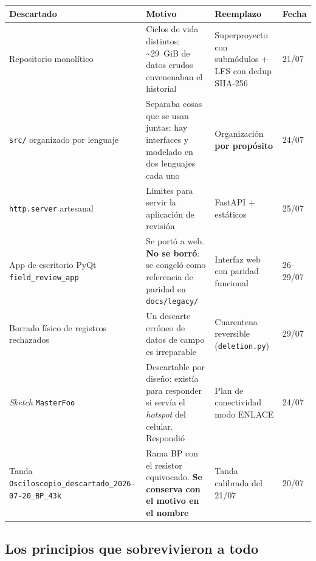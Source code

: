 \begin{center}\footnotesize
\begin{tabularx}{\textwidth}{@{}l X X l@{}}
\toprule
\textbf{Descartado} & \textbf{Motivo} & \textbf{Reemplazo} & \textbf{Fecha} \\
\midrule
Repositorio monol\'itico
& Ciclos de vida distintos; \textasciitilde{}29~GiB de datos crudos envenenaban el historial
& Superproyecto con subm\'odulos $+$ LFS con dedup SHA-256
& 21/07 \\
\addlinespace[2pt]
\texttt{src/} organizado por lenguaje
& Separaba cosas que se usan juntas: hay interfaces y modelado en dos lenguajes cada uno
& Organizaci\'on \textbf{por prop\'osito}
& 24/07 \\
\addlinespace[2pt]
\texttt{http.server} artesanal
& L\'imites para servir la aplicaci\'on de revisi\'on
& FastAPI $+$ est\'aticos
& 25/07 \\
\addlinespace[2pt]
App de escritorio PyQt \texttt{field\_review\_app}
& Se port\'o a web. \textbf{No se borr\'o}: se congel\'o como referencia de paridad en \texttt{docs/legacy/}
& Interfaz web con paridad funcional
& 26--29/07 \\
\addlinespace[2pt]
Borrado f\'isico de registros rechazados
& Un descarte err\'oneo de datos de campo es irreparable
& Cuarentena reversible (\texttt{deletion.py})
& 29/07 \\
\addlinespace[2pt]
\emph{Sketch} \texttt{MasterFoo}
& Descartable por dise\~no: exist\'ia para responder si serv\'ia el \emph{hotspot} del celular. Respondi\'o
& Plan de conectividad modo ENLACE
& 24/07 \\
\addlinespace[2pt]
Tanda \texttt{Osciloscopio\_descartado\_2026-07-20\_BP\_43k}
& Rama BP con el resistor equivocado. \textbf{Se conserva con el motivo en el nombre}
& Tanda calibrada del 21/07
& 20/07 \\
\bottomrule
\end{tabularx}
\end{center}

\subsection{Los principios que sobrevivieron a todo}

